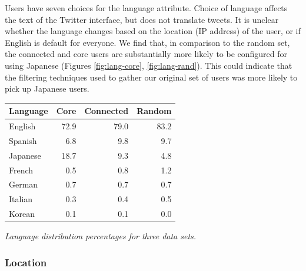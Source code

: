 Users have seven choices for the language attribute.  Choice of language affects the text of the Twitter interface, but does not translate tweets.  It is unclear whether the language changes based on the location (IP address) of the user, or if English is default for everyone.  We find that, in comparison to the random set, the connected and core users are substantially more likely to be configured for using Japanese (Figures \ref{fig:lang-core}, \ref{fig:lang-rand}).  This could indicate that the filtering techniques used to gather our original set of users was more likely to pick up Japanese users.

\begin{center}
\begin{tabular}{| l |  r | r | r |}
\hline
\textbf{Language} & \textbf{Core} & \textbf{Connected} & \textbf{Random} \\ \hline
English & 72.9 & 79.0 & 83.2 \\ \hline
Spanish & 6.8 & 9.8 & 9.7 \\ \hline
Japanese & 18.7 & 9.3 & 4.8 \\ \hline
French & 0.5 & 0.8 & 1.2 \\ \hline
German & 0.7 & 0.7 & 0.7 \\ \hline
Italian & 0.3 & 0.4 & 0.5 \\ \hline
Korean & 0.1 &  0.1 & 0.0 \\ \hline
\end{tabular}
\end{center}
\textit{Language distribution percentages for three data sets.}\\

\subsubsection{Location}

